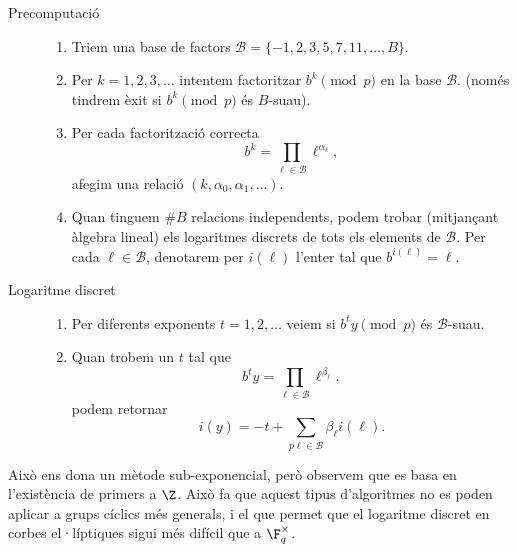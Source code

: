   \begin{description}
  \item[Precomputació]\hfill
  
    \begin{enumerate}
      \item Triem una base de factors $\mathcal B=\{-1,2,3,5,7,11,\ldots,B\}$.
      \item Per $k=1,2,3,\ldots$ intentem factoritzar $b^k\pmod p$ en la base $\mathcal B$. (només tindrem èxit si $b^k\pmod p$ és $B$-suau).
      \item Per cada factorització correcta
      \[
      b^k=\prod_{\ell\in \mathcal B} \ell^{\alpha_\ell},
      \]
      afegim una relació $(k,\alpha_0,\alpha_1,\ldots)$.
      \item Quan tinguem $\#B$ relacions independents, podem trobar (mitjançant àlgebra lineal) els logaritmes discrets de tots els elements de $\mathcal B$. Per cada $\ell\in\mathcal B$, denotarem per $i(\ell)$ l'enter tal que $b^{i(\ell)} = \ell$.
    \end{enumerate}
    \item[Logaritme discret]\hfill
    \begin{enumerate}
        \item Per diferents exponents $t=1,2,\ldots$ veiem si
        $b^t y\pmod p$ és $\mathcal{B}$-suau.
        \item Quan trobem un $t$ tal que
        \[
        b^t y = \prod_{\ell\in\mathcal B} \ell^{\beta_\ell},
        \]
        podem retornar
        \[
        i(y) = -t + \sum_{p
        \ell\in\mathcal{B}} \beta_\ell i(\ell).
        \]
    \end{enumerate}
  \end{description}

 Això ens dona un mètode sub-exponencial, però observem que es basa en l'existència de primers a $\Z$. Això fa que aquest tipus d'algoritmes no es poden aplicar a grups cíclics més generals, i el que permet que el logaritme discret en corbes el·líptiques sigui més difícil que a $\F_q^\times$.